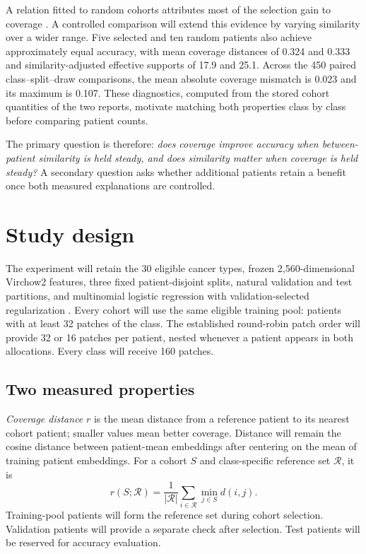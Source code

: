 \documentclass[11pt]{article}
\begin{document}
A relation fitted to random cohorts attributes most of the selection gain to coverage \citep{queisler2026coverageRedundancy}. A controlled comparison will extend this evidence by varying similarity over a wider range. Five selected and ten random patients also achieve approximately equal accuracy, with mean coverage distances of 0.324 and 0.333 and similarity-adjusted effective supports of 17.9 and 25.1. Across the 450 paired class--split--draw comparisons, the mean absolute coverage mismatch is 0.023 and its maximum is 0.107. These diagnostics, computed from the stored cohort quantities of the two reports, motivate matching both properties class by class before comparing patient counts.

The primary question is therefore: \emph{does coverage improve accuracy when between-patient similarity is held steady, and does similarity matter when coverage is held steady?} A secondary question asks whether additional patients retain a benefit once both measured explanations are controlled.

\section{Study design}
\label{sec:design}
The experiment will retain the 30 eligible cancer types, frozen 2,560-dimensional Virchow2 features, three fixed patient-disjoint splits, natural validation and test partitions, and multinomial logistic regression with validation-selected regularization \citep{queisler2026shortageSelection}. Every cohort will use the same eligible training pool: patients with at least 32 patches of the class. The established round-robin patch order will provide 32 or 16 patches per patient, nested whenever a patient appears in both allocations. Every class will receive 160 patches.

\subsection{Two measured properties}
\label{sec:quantities}
\emph{Coverage distance} $r$ is the mean distance from a reference patient to its nearest cohort patient; smaller values mean better coverage. Distance will remain the cosine distance between patient-mean embeddings after centering on the mean of training patient embeddings. For a cohort $S$ and class-specific reference set $\mathcal R$, it is
\begin{equation}
 r(S;\mathcal R)=\frac{1}{|\mathcal R|}\sum_{i\in\mathcal R}\min_{j\in S}d(i,j).
 \label{eq:coverage}
\end{equation}
\noindent Training-pool patients will form the reference set during cohort selection. Validation patients will provide a separate check after selection. Test patients will be reserved for accuracy evaluation.
\end{document}
